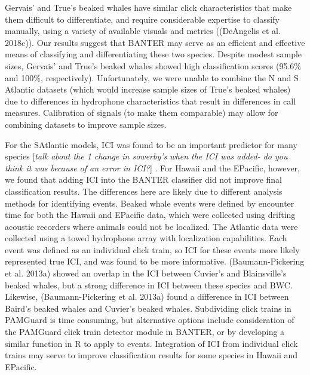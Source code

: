 \documentclass[
  letterpaper,
  DIV=11,
  numbers=noendperiod]{scrartcl}
\begin{document}
Gervais' and True's beaked whales have similar click characteristics
that make them difficult to differentiate, and require considerable
expertise to classify manually, using a variety of available visuals and
metrics ((DeAngelis et al. 2018c)). Our results suggest that BANTER may
serve as an efficient and effective means of classifying and
differentiating these two species. Despite modest sample sizes, Gervais'
and True's beaked whales showed high classification scores (95.6\% and
100\%, respectively). Unfortunately, we were unable to combine the N and
S Atlantic datasets (which would increase sample sizes of True's beaked
whales) due to differences in hydrophone characteristics that result in
differences in call measures. Calibration of signals (to make them
comparable) may allow for combining datasets to improve sample sizes.

For the SAtlantic models, ICI was found to be an important predictor for
many species {[}\emph{talk about the 1 change in sowerby's when the ICI
was added- do you think it was because of an error in ICI?}{]} . For
Hawaii and the EPacific, however, we found that adding ICI into the
BANTER classifier did not improve final classification results. The
differences here are likely due to different analysis methods for
identifying events. Beaked whale events were defined by encounter time
for both the Hawaii and EPacific data, which were collected using
drifting acoustic recorders where animals could not be localized. The
Atlantic data were collected using a towed hydrophone array with
localization capabilities. Each event was defined as an individual click
train, so ICI for these events more likely represented true ICI, and was
found to be more informative. (Baumann-Pickering et al. 2013a) showed an
overlap in the ICI between Cuvier's and Blainsville's beaked whales, but
a strong difference in ICI between these species and BWC. Likewise,
(Baumann-Pickering et al. 2013a) found a difference in ICI between
Baird's beaked whales and Cuvier's beaked whales. Subdividing click
trains in PAMGuard is time consuming, but alternative options include
consideration of the PAMGuard click train detector module in BANTER, or
by developing a similar function in R to apply to events. Integration of
ICI from individual click trains may serve to improve classification
results for some species in Hawaii and EPacific.
\end{document}
